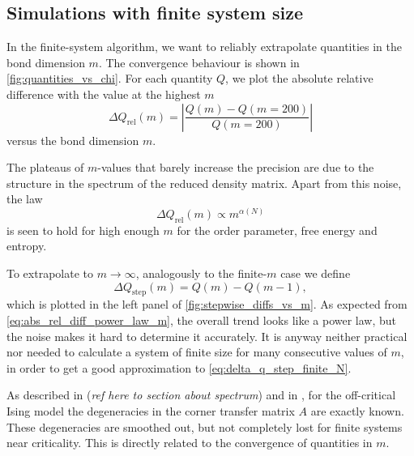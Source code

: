 


\subsection{Simulations with finite system size}
In the finite-system algorithm, we want to reliably extrapolate quantities in the bond dimension $m$.
The convergence behaviour is shown in \autoref{fig:quantities_vs_chi}.
For each quantity $Q$, we plot the absolute relative difference with the value at the highest $m$
\begin{equation}\label{eq:abs_rel_diff_quantity_m}
  \Delta Q_{\text{rel}}(m) = \left| \frac{Q(m) - Q(m = 200)}{Q(m = 200)} \right|
\end{equation}
versus the bond dimension $m$.

The plateaus of $m$-values that barely increase the precision are due to the structure in the spectrum of the reduced
density matrix. Apart from this noise, the law
\begin{equation}\label{eq:abs_rel_diff_power_law_m}
  \Delta Q_{\text{rel}}(m) \propto m^{\alpha(N)}
\end{equation}
is seen to hold for high enough $m$ for the order parameter, free energy and entropy.


To extrapolate to $m \to \infty$, analogously to the finite-$m$ case we define
\begin{equation}\label{eq:delta_q_step_finite_N}
  \Delta Q_{\text{step}}(m) = Q(m) - Q(m - 1),
\end{equation}
which is plotted in the left panel of \autoref{fig:stepwise_diffs_vs_m}.
As expected from \autoref{eq:abs_rel_diff_power_law_m}, the overall trend looks like a power law,
but the noise makes it hard to determine it accurately.
It is anyway neither practical nor needed to calculate a system of finite size for many consecutive values of $m$,
in order to get a good approximation to \autoref{eq:delta_q_step_finite_N}.

As described in (\emph{ref here to section about spectrum}) and in \cite{okunishi1999universal,
davies1988corner, peschel2009reduced}, for the off-critical Ising model the degeneracies in the corner transfer matrix
$A$ are exactly known.
These degeneracies are smoothed out, but not completely lost for finite systems near criticality. This is directly related to the convergence of quantities in $m$.

